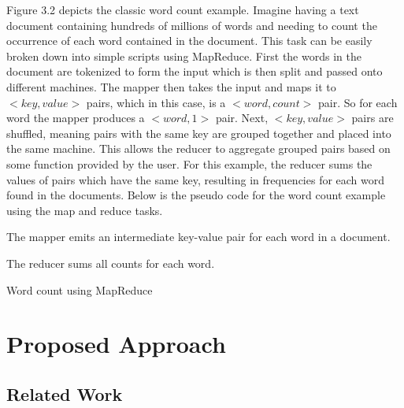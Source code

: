 \documentclass[12pt]{report}
\begin{document}
Figure 3.2 depicts the classic word count example. Imagine having a text document containing hundreds of millions of words and needing to count the occurrence of each word contained in the document. This task can be easily broken down into simple scripts using MapReduce.  First the words in the document are tokenized to form the input which is then split and passed onto different machines. The mapper then takes the input and maps it to $<key, value>$ pairs, which in this case, is a $<word, count>$ pair.  So for each word the mapper produces a $<word, 1>$ pair.  Next, $<key, value>$ pairs are shuffled, meaning pairs with the same key are grouped together and placed into the same machine. This allows the reducer to aggregate grouped pairs based on some function provided by the user.  For this example, the reducer sums the values of pairs which have the same key, resulting in frequencies for each word found in the documents.   Below is the pseudo code for the word count example using the map and reduce tasks.


\begin{algorithm}[H]
 The mapper emits an intermediate key-value pair for each word in a document.
 
 The reducer sums all counts for each word.
 
 \hfill \break

\caption{Word count using MapReduce \cite{wordCountPseudo}}
\end{algorithm}


\chapter{Proposed Approach}

\section{Related Work}
\end{document}
